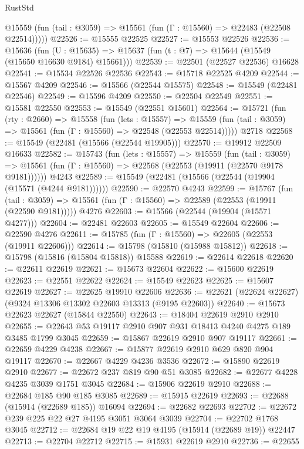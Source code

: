 \begin{lexlean}{RustStd}
\begin{coremodule}
      @15559 (fun (tail : @3059) => @15561 (fun (Γ : @15560) => @22483 (@22508 @22514)))))
@22526 := @15555 @22525
@22527 := @15553 @22526
@22536 := @15636
    (fun (U : @15635) => @15637 (fun (t : @7) => @15644 (@15549 (@15650 @16630 @9184) @15661)))
@22539 := @22501 (@22527 @22536) @16628
@22541 := @15534 @22526 @22536
@22543 := @15718 @22525 @4209
@22544 := @15567 @4209
@22546 := @15566 (@22544 @15575)
@22548 := @15549 (@22481 @22546)
@22549 := @15596 @4209
@22550 := @22504 @22549
@22551 := @15581 @22550
@22553 := @15549 (@22551 @15601)
@22564 := @15721
    (fun (rty : @2660) =>
    @15558
      (fun (lets : @15557) =>
      @15559 (fun (tail : @3059) => @15561 (fun (Γ : @15560) => @22548 (@22553 @22514)))))
    @2718
@22568 := @15549 (@22481 (@15566 (@22544 @19905)))
@22570 := @19912 @22509 @16633
@22582 := @15743
    (fun (lets : @15557) =>
    @15559
      (fun (tail : @3059) =>
      @15561 (fun (Γ : @15560) => @22568 (@22553 (@19911 (@22570 @9178 @9181))))))
    @4243
@22589 := @15549 (@22481 (@15566 (@22544 (@19904 (@15571 (@4244 @9181))))))
@22590 := @22570 @4243
@22599 := @15767
    (fun (tail : @3059) => @15561 (fun (Γ : @15560) => @22589 (@22553 (@19911 (@22590 @9181)))))
    @4276
@22603 := @15566 (@22544 (@19904 (@15571 @4277)))
@22604 := @22481 @22603
@22605 := @15549 @22604
@22606 := @22590 @4276
@22611 := @15785 (fun (Γ : @15560) => @22605 (@22553 (@19911 @22606)))
@22614 := @15798 (@15810 (@15988 @15812))
@22618 := @15798 (@15816 (@15804 @15818)) @15588
@22619 := @22614 @22618
@22620 := @22611 @22619
@22621 := @15673 @22604
@22622 := @15600 @22619
@22623 := @22551 @22622
@22624 := @15549 @22623
@22625 := @15607 @22619
@22627 := @22625 @19910 @22606
@22636 := @22621 (@22624 @22627) (@9324 @13306 @13302 @22603 @13313 (@9195 @22603))
@22640 := @15673 @22623 @22627 (@15844 @22550)
@22643 := @18404 @22619 @2910 @2910
@22655 := @22643 @53 @19117 @2910 @907 @931 @18413 @4240 @4275 @189 @3485 @1799 @3045
@22659 := @15867 @22619 @2910 @907 @19117
@22661 := @22659 @4229 @4238
@22667 := @15877 @22619 @2910 @629 @820 @904 @19117
@22670 := @22667 @4229 @4236 @3536
@22672 := @15890 @22619 @2910
@22677 := @22672 @237 @819 @90 @51 @3085
@22682 := @22677 @4228 @4235 @3039 @1751 @3045
@22684 := @15906 @22619 @2910
@22688 := @22684 @185 @90 @185 @3085
@22689 := @15915 @22619
@22693 := @22688 (@15914 (@22689 @185)) @16094
@22694 := @22682 @22693
@22702 := @22672 @239 @225 @22 @27 @4195 @3051 @3064 @3039
@22704 := @22702 @1768 @3045
@22712 := @22684 @19 @22 @19 @4195 (@15914 (@22689 @19)) @22447
@22713 := @22704 @22712
@22715 := @15931 @22619 @2910
@22736 := @22655

\end{coremodule}
\end{lexlean}
